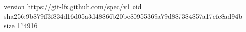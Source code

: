 version https://git-lfs.github.com/spec/v1
oid sha256:9b879ff3f834d16d05a3d48866b20be80955369a79d887384857a17efc8ad94b
size 174916
